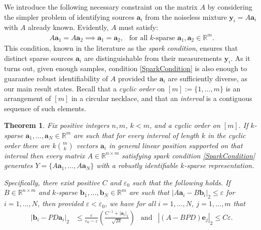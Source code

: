 \documentclass[journal, onecolumn]{IEEEtran}
\newtheorem{theorem}{Theorem}
\begin{document}
We introduce the following necessary constraint on the matrix $A$ by considering the simpler problem of identifying sources $\mathbf{a}_i$ from the noiseless mixture $\mathbf{y}_i = A\mathbf{a}_i$ with $A$ already known. Evidently, $A$ must satisfy:
\begin{align}\label{SparkCondition}
A\mathbf{a}_1 = A\mathbf{a}_2 \implies \mathbf{a}_1 = \mathbf{a}_2, \ \ \text{ for all $k$-sparse } \mathbf{a}_1, \mathbf{a}_2 \in \mathbb{R}^m.
\end{align}
This condition, known in the literature as the \emph{spark condition}, ensures that distinct sparse sources $\mathbf{a}_i$ are distinguishable from their measurements $\mathbf{y}_i$. As it turns out, given enough samples, condition \eqref{SparkCondition} is also enough to guarantee robust identifiability of $A$ provided the $\mathbf{a}_i$ are sufficiently diverse, as our main result states.  Recall that a \textit{cyclic order} on $[m] := \{1, \ldots,m\}$ is an arrangement of $[m]$ in a circular necklace, and that an \textit{interval} is a contiguous sequence of such elements.

\begin{theorem}\label{DeterministicUniquenessTheorem}
Fix positive integers $n, m$, $k < m$, and a cyclic order on $[m]$. If $k$-sparse $\mathbf{a}_1, \ldots, \mathbf{a}_N \in \mathbb{R}^m$ are such that for every interval of length $k$ in the cyclic order there are $k{m \choose k}$ vectors $\mathbf{a}_i$ in general linear position supported on that interval then every matrix $A \in \mathbb{R}^{n \times m}$ satisfying spark condition \eqref{SparkCondition} generates $Y = \{A\mathbf{a}_1, \ldots, A\mathbf{a}_N\}$ with a robustly identifiable $k$-sparse representation.

Specifically, there exist positive $C$ and $\varepsilon_0$ such that the following holds. If $B \in \mathbb{R}^{n \times m}$ and $k$-sparse $\mathbf{b}_1, \ldots, \mathbf{b}_N \in \mathbb{R}^m$ are such that $|A\mathbf{a}_i - B\mathbf{b}_i|_2 \leq \varepsilon$ for $i = 1, \ldots, N$, then provided $\varepsilon < \varepsilon_0$, we have for all $i = 1, \ldots, N$, $j = 1, \ldots, m$  that
\begin{align}\label{Cstable}
|\mathbf{b}_i - PD\mathbf{a}_i|_2 &\leq \frac{\varepsilon }{\varepsilon_0 - \varepsilon} \left( \frac{C^{-1}+|\mathbf{a}_i|_1}{ \sqrt{2k} } \right) \ \ \text{ and }  \ \  |(A-BPD)\mathbf{e}_j|_2 \leq C\varepsilon.%
\end{align}
\end{theorem}
\end{document}
